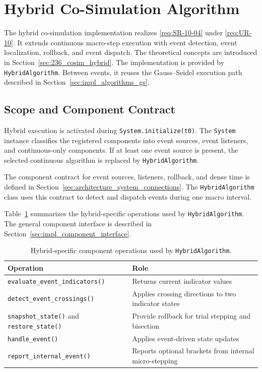 \section{Hybrid Co-Simulation Algorithm}
\label{sec:impl_hybrid}

The hybrid co-simulation implementation realizes \ref{req:SR-10-04} under \ref{req:UR-10}.
It extends continuous macro-step execution with event detection, event localization, rollback, and event dispatch.
The theoretical concepts are introduced in Section~\ref{sec:236_cosim_hybrid}.
The implementation is provided by \texttt{HybridAlgorithm}.
Between events, it reuses the Gauss--Seidel execution path described in Section~\ref{sec:impl_algorithms_gs}.

\subsection{Scope and Component Contract}
\label{sec:impl_hybrid_scope}

Hybrid execution is activated during \texttt{System.initialize(t0)}.
The \texttt{System} instance classifies the registered components into event sources, event listeners, and continuous-only components.
If at least one event source is present, the selected continuous algorithm is replaced by \texttt{HybridAlgorithm}.

The component contract for event sources, listeners, rollback, and dense time is defined in Section~\ref{sec:architecture_system_connections}.
The \texttt{HybridAlgorithm} class uses this contract to detect and dispatch events during one macro interval.

Table~\ref{tab:hybrid_component_contract} summarizes the hybrid-specific operations used by \texttt{HybridAlgorithm}.
The general component interface is described in Section~\ref{sec:impl_component_interface}.

\begin{table}[htbp]
  \centering
  \small
  \caption[Hybrid-specific component operations]{Hybrid-specific component operations used by \texttt{HybridAlgorithm}.}
  \label{tab:hybrid_component_contract}
  \begin{tabular}{lp{9.5cm}}
    \toprule
    \textbf{Operation} & \textbf{Role} \\
    \midrule
    \texttt{evaluate\_event\_indicators()} & Returns current indicator values \\
    \texttt{detect\_event\_crossings()} & Applies crossing directions to two indicator states \\
    \texttt{snapshot\_state()} and \texttt{restore\_state()} & Provide rollback for trial stepping and bisection \\
    \texttt{handle\_event()} & Applies event-driven state updates \\
    \texttt{report\_internal\_event()} & Reports optional brackets from internal micro-stepping \\
    \bottomrule
  \end{tabular}
\end{table}

